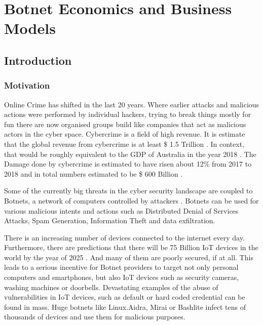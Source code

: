 \chapter{Botnet Economics and Business Models}


\newpage

\minitoc %

\newpage

\section{Introduction}

\subsection{Motivation}
Online Crime has shifted in the last 20 years. Where earlier attacks and malicious actions were performed by individual hackers, trying to break things mostly for fun there are now organised groups build like companies that act as malicious actors in the cyber space.
Cybercrime is a field of high revenue. It is estimate that the global revenue from cybercrime is at least \$ 1.5 Trillion \cite{McGuire18}. In context, that would be roughly equivalent to the GDP of Australia in the year 2018 \cite{Worldbank19}. 
The Damage done by cybercrime is estimated to have risen about 12\% from 2017 to 2018 \cite{Accenture17} and in total numbers estimated to be \$ 600 Billion \cite{McAfee18}. 

Some of the currently big threats in the cyber security landscape are coupled to Botnets, a network of computers controlled by attackers \cite{Putman}. Botnets can be used for various malicious intents and actions such as Distributed Denial of Services Attacks, Spam Generation, Information Theft and data exfiltration. 

There is an increasing number of devices connected to the internet every day. Furthermore, there are predictions that there will be 75 Billion IoT devices in the world by the year of 2025 \cite{Statista}. 
And many of them are poorly secured, if at all. This leads to a serious incentive for Botnet providers to target not only personal computers and smartphones, but also IoT devices such as security cameras, washing machines or doorbells. Devastating examples of the abuse of vulnerabilities in IoT devices, such as default or hard coded credential can be found in mass. Huge botnets like Linux.Aidra, Mirai or Bashlite infect tens of thousands of devices and use them for malicious purposes.   

